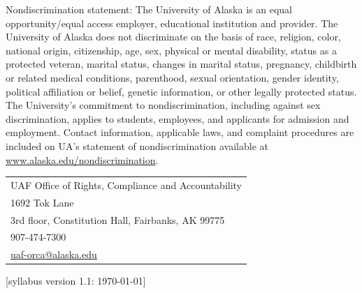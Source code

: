\documentclass[12pt]{article}
\begin{document}
Nondiscrimination statement: The University of Alaska is an equal opportunity/equal access employer, educational institution and provider. The University of Alaska does not discriminate on the basis of race, religion, color, national origin, citizenship, age, sex, physical or mental disability, status as a protected veteran, marital status, changes in marital status, pregnancy, childbirth or related medical conditions, parenthood, sexual orientation, gender identity, political affiliation or belief, genetic information, or other legally protected status. The University's commitment to nondiscrimination, including against sex discrimination, applies to students, employees, and applicants for admission and employment. Contact information, applicable laws, and complaint procedures are included on UA's statement of nondiscrimination available at \url{www.alaska.edu/nondiscrimination}.

\begin{tabular}{l}
UAF Office of Rights, Compliance and Accountability\\
1692 Tok Lane\\
3rd floor, Constitution Hall, Fairbanks, AK 99775\\
907-474-7300\\
\url{uaf-orca@alaska.edu}
\end{tabular}

\hfill  \scriptsize [syllabus version 1.1: \today] \normalsize
\end{document}
